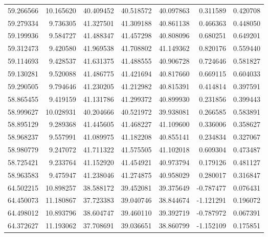 \begin{tabular}{rrrrrrr}
 59.266566 &  10.165620 &         40.409452 &         40.518572 &         40.097863 &  0.311589 &  0.420708 \\
 59.279334 &   9.736305 &         41.327501 &         41.309188 &         40.861138 &  0.466363 &  0.448050 \\
 59.199936 &   9.584727 &         41.488347 &         41.457298 &         40.808096 &  0.680251 &  0.649201 \\
 59.312473 &   9.420580 &         41.969538 &         41.708802 &         41.149362 &  0.820176 &  0.559440 \\
 59.114693 &   9.428537 &         41.631375 &         41.488555 &         40.906728 &  0.724646 &  0.581827 \\
 59.130281 &   9.520088 &         41.486775 &         41.421694 &         40.817660 &  0.669115 &  0.604033 \\
 59.290505 &   9.794646 &         41.230205 &         41.212982 &         40.815391 &  0.414814 &  0.397591 \\
 58.865455 &   9.419159 &         41.131786 &         41.299372 &         40.899930 &  0.231856 &  0.399443 \\
 58.999627 &  10.028931 &         40.204666 &         40.521972 &         39.938081 &  0.266585 &  0.583891 \\
 58.895129 &   9.289368 &         41.445605 &         41.468227 &         41.109600 &  0.336006 &  0.358627 \\
 58.968237 &   9.557991 &         41.089975 &         41.182208 &         40.855141 &  0.234834 &  0.327067 \\
 58.980779 &   9.247072 &         41.711322 &         41.575505 &         41.102018 &  0.609304 &  0.473487 \\
 58.725421 &   9.233764 &         41.152920 &         41.454921 &         40.973794 &  0.179126 &  0.481127 \\
 58.963583 &   9.475947 &         41.238046 &         41.274875 &         40.958029 &  0.280017 &  0.316847 \\
 64.502215 &  10.898257 &         38.588172 &         39.452081 &         39.375649 & -0.787477 &  0.076431 \\
 64.450073 &  11.180867 &         37.723383 &         39.040746 &         38.844674 & -1.121291 &  0.196072 \\
 64.498012 &  10.893796 &         38.604747 &         39.460110 &         39.392719 & -0.787972 &  0.067391 \\
 64.372627 &  11.193062 &         37.708691 &         39.036651 &         38.860799 & -1.152109 &  0.175851 \\

\end{tabular}
